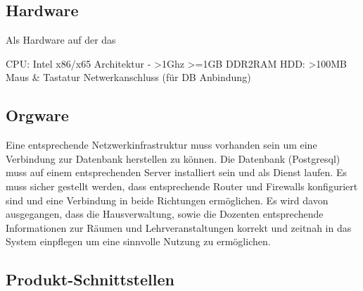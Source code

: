 \subsection{Hardware}
\label{subsec:hardware}

Als Hardware auf der das 

CPU: Intel x86/x65 Architektur - >1Ghz
>=1GB DDR2RAM
HDD: >100MB
Maus \& Tastatur
Netwerkanschluss (für DB Anbindung)

\subsection{Orgware}
Eine entsprechende Netzwerkinfrastruktur muss vorhanden sein um eine Verbindung zur Datenbank herstellen zu können.
Die Datenbank (Postgresql) muss auf einem entsprechenden Server installiert sein und als Dienst laufen. Es muss sicher gestellt werden, dass entsprechende Router und Firewalls konfiguriert sind und eine Verbindung in beide Richtungen ermöglichen.
Es wird davon ausgegangen, dass die Hausverwaltung, sowie die Dozenten entsprechende Informationen zur Räumen und Lehrveranstaltungen korrekt und zeitnah in das System einpflegen um eine sinnvolle Nutzung zu ermöglichen.

\subsection{Produkt-Schnittstellen}

